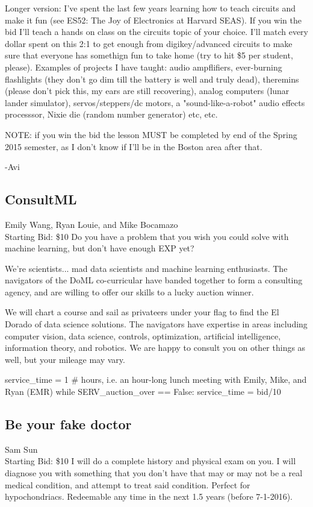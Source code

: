 \documentclass[11pt]{article}
\begin{document}
Longer version:  I've spent the last few years learning how to teach circuits and make it fun (see ES52: The Joy of Electronics at Harvard SEAS).  If you win the bid I'll teach a hands on class on the circuits topic of your choice.  I'll match every dollar spent on this 2:1 to get enough from digikey/advanced circuits to make sure that everyone has somethign fun to take home (try to hit \$5 per student, please).  Examples of projects I have taught: audio ampflifiers, ever-burning flashlights (they don't go dim till the battery is well and truly dead), theremins (please don't pick this, my ears are still recovering), analog computers (lunar lander simulator), servos/steppers/dc motors, a "sound-like-a-robot" audio effects processsor, Nixie die (random number generator) etc, etc.  

NOTE: if you win the bid the lesson MUST be completed by end of the Spring 2015 semester, as I don't know if I'll be in the Boston area after that.

-Avi
\subsection{ConsultML}
Emily Wang, Ryan Louie, and Mike Bocamazo
\\
Starting Bid: \$10
\newline
Do you have a problem that you wish you could solve with machine learning, but don't have enough EXP yet?

We're scientists... mad data scientists and machine learning enthusiasts. The navigators of the DoML co-curricular have banded together to form a consulting agency, and are willing to offer our skills to a lucky auction winner. 

We will chart a course and sail as privateers under your flag to find the El Dorado of data science solutions. The navigators have expertise in areas including computer vision, data science, controls, optimization, artificial intelligence, information theory, and robotics. We are happy to consult you on other things as well, but your mileage may vary. 

service\_time = 1 \# hours, i.e. an hour-long lunch meeting with Emily, Mike, and Ryan (EMR)
while SERV\_auction\_over == False:
    service\_time = bid/10
\subsection{Be your fake doctor}
Sam Sun
\\
Starting Bid: \$10
\newline
I will do a complete history and physical exam on you.  I will diagnose you with something that you don't have that may or may not be a real medical condition, and attempt to treat said condition.  Perfect for hypochondriacs.  Redeemable any time in the next 1.5 years (before 7-1-2016).
\end{document}
